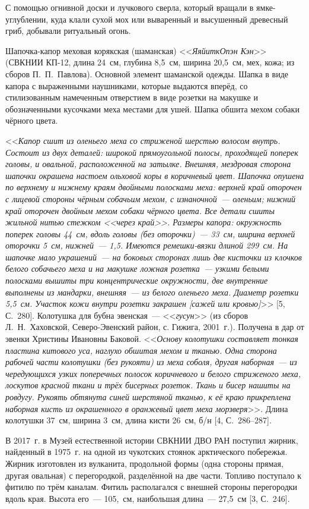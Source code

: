 С помощью огнивной доски и лучкового сверла, который вращали в ямке-углублении, куда клали сухой мох или вываренный и высушенный древесный гриб, добывали ритуальный огонь.

Шапочка-капор меховая корякская (шаманская) <<\textit{ЯяйиткОпэн Кэн}>> (СВКНИИ КП-12, длина 24~см, глубина 8,5~см, ширина 20,5~см, мех, кожа; из сборов П.~П.~Павлова). Основной элемент шаманской одежды. Шапка в виде капора с выраженными наушниками, которые выдаются вперёд, со стилизованным намеченным отверстием в виде розетки на макушке и обозначенными кусочками меха местами для ушей. Шапка обшита мехом собаки чёрного цвета.

<<\textit{Капор сшит из оленьего меха со стриженой шерстью волосом внутрь. Состоит из двух деталей: широкой прямоугольной полосы, проходящей поперек головы, и овальной, расположенной на затылке. Внешняя, мездровая сторона шапочки окрашена настоем ольховой коры в коричневый цвет. Шапочка опушена по верхнему и нижнему краям двойными полосками меха: верхней край оторочен с лицевой стороны чёрным собачьим мехом, с изнаночной~--- оленьим; нижний край оторочен двойным мехом собаки чёрного цвета. Все детали сшиты жильной нитью стежком <<\textit{через край}>>. Размеры капора: окружность поперек головы 44~см, вдоль головы (без оторочки)~--- 33~см, ширина верхней оторочки 5~см, нижней~--- 1,5. Имеются ремешки-вязки длиной 299~см. На шапочке мало украшений~--- на боковых сторонах лишь две кисточки из клочков белого собачьего меха и на макушке ложная розетка~--- узкими белыми полосками вышиты три концентрические окружности, две внутренние выполнены из мандарки, внешняя~--- из белого оленьего меха. Диаметр розетки 5,5~см. Участок кожи внутри розетки закрашен [сажей или кровью]}>> [5, С.~280].
\clearpage
Колотушка для бубна эвенская~--- <<\textit{гусун}>> (из сборов Л.~Н.~Хаховской, Северо-Эвенский район, с. Гижига, 2001~г.). Получена в дар от эвенки Христины Ивановны Баковой. <<\textit{Основу колотушки составляет тонкая пластина китового уса, наглухо обшитая мехом и тканью. Одна сторона рабочей части колотушки (без рукояти) из меха соболя, другая наборная~--- из чередующихся узких поперечных полосок коричневого и белого стриженого меха, лоскутов красной ткани и трёх бисерных розеток. Ткань и бисер нашиты на ровдугу. Рукоять обтянута синей шерстяной тканью, к её краю прикреплена наборная кисть из окрашенного в оранжевый цвет меха морзверя}>>. Длина колотушки 37~см, ширина 3~см, длина кисти 26~см, б/н [4, С.~286--287].

В 2017~г. в Музей естественной истории СВКНИИ ДВО РАН поступил жирник, найденный в 1975~г. на одной из чукотских стоянок арктического побережья. Жирник изготовлен из вулканита, продольной формы (одна стороны прямая, другая овальная) с перегородкой, разделённой на две части. Топливо поступало к фитилю по трём каналам. Фитиль располагался с внешней стороны перегородки вдоль края. Высота его~--- 105,~см, наибольшая длина~--- 27,5~см [3, С.~246].

